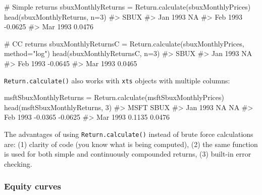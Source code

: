 \documentclass[
  letterpaper,
  DIV=11,
  numbers=noendperiod]{scrreprt}
\newenvironment{Shaded}{\begin{snugshade}}{\end{snugshade}}
\newcommand{\AttributeTok}[1]{\textcolor[rgb]{0.40,0.45,0.13}{#1}}
\newcommand{\CommentTok}[1]{\textcolor[rgb]{0.37,0.37,0.37}{#1}}
\newcommand{\DecValTok}[1]{\textcolor[rgb]{0.68,0.00,0.00}{#1}}
\newcommand{\FunctionTok}[1]{\textcolor[rgb]{0.28,0.35,0.67}{#1}}
\newcommand{\NormalTok}[1]{\textcolor[rgb]{0.00,0.23,0.31}{#1}}
\newcommand{\OtherTok}[1]{\textcolor[rgb]{0.00,0.23,0.31}{#1}}
\newcommand{\StringTok}[1]{\textcolor[rgb]{0.13,0.47,0.30}{#1}}
\theoremstyle{definition}
\theoremstyle{definition}
\theoremstyle{remark}
\begin{document}
\begin{Shaded}
\begin{Highlighting}[]
\CommentTok{\# Simple returns}
\NormalTok{sbuxMonthlyReturns }\OtherTok{=} \FunctionTok{Return.calculate}\NormalTok{(sbuxMonthlyPrices) }
\FunctionTok{head}\NormalTok{(sbuxMonthlyReturns, }\AttributeTok{n=}\DecValTok{3}\NormalTok{)}
\CommentTok{\#\textgreater{}             SBUX}
\CommentTok{\#\textgreater{} Jan 1993      NA}
\CommentTok{\#\textgreater{} Feb 1993 {-}0.0625}
\CommentTok{\#\textgreater{} Mar 1993  0.0476}
\end{Highlighting}
\end{Shaded}

\begin{Shaded}
\begin{Highlighting}[]
\CommentTok{\# CC returns }
\NormalTok{sbuxMonthlyReturnsC }\OtherTok{=} \FunctionTok{Return.calculate}\NormalTok{(sbuxMonthlyPrices, }\AttributeTok{method=}\StringTok{"log"}\NormalTok{) }
\FunctionTok{head}\NormalTok{(sbuxMonthlyReturnsC, }\AttributeTok{n=}\DecValTok{3}\NormalTok{)}
\CommentTok{\#\textgreater{}             SBUX}
\CommentTok{\#\textgreater{} Jan 1993      NA}
\CommentTok{\#\textgreater{} Feb 1993 {-}0.0645}
\CommentTok{\#\textgreater{} Mar 1993  0.0465}
\end{Highlighting}
\end{Shaded}

\texttt{Return.calculate()} also works with \texttt{xts} objects with
multiple columns:

\begin{Shaded}
\begin{Highlighting}[]
\NormalTok{msftSbuxMonthlyReturns }\OtherTok{=} \FunctionTok{Return.calculate}\NormalTok{(msftSbuxMonthlyPrices)}
\FunctionTok{head}\NormalTok{(msftSbuxMonthlyReturns, }\DecValTok{3}\NormalTok{)}
\CommentTok{\#\textgreater{}             MSFT    SBUX}
\CommentTok{\#\textgreater{} Jan 1993      NA      NA}
\CommentTok{\#\textgreater{} Feb 1993 {-}0.0365 {-}0.0625}
\CommentTok{\#\textgreater{} Mar 1993  0.1135  0.0476}
\end{Highlighting}
\end{Shaded}

The advantages of using \texttt{Return.calculate()} instead of brute
force calculations are: (1) clarity of code (you know what is being
computed), (2) the same function is used for both simple and
continuously compounded returns, (3) built-in error checking.

\hypertarget{equity-curves}{%
\subsubsection{Equity curves}\label{equity-curves}}
\end{document}
